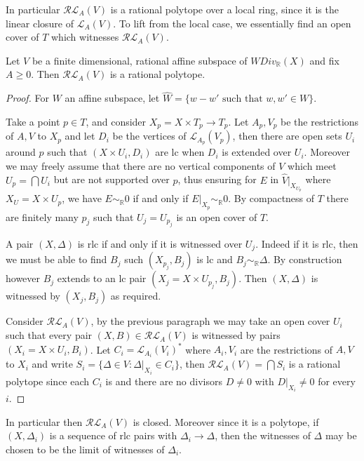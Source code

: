 	
	In particular $\mathcal{RL}_{A}(V)$ is a rational polytope over a local ring, since it is the linear closure of $\mathcal{L}_{A}(V)$. To lift from the local case, we essentially find an open cover of $T$ which witnesses $\mathcal{RL}_{A}(V)$.
	
	\begin{theorem}\label{rlt-poly}
		Let $V$ be a finite dimensional, rational affine subspace of $WDiv_{\mathbb{R}}(X)$ and fix $A \geq 0$. Then $\mathcal{RL}_{A}(V)$ is a rational polytope.
	\end{theorem}
	
	\begin{proof}
		For $W$ an affine subspace, let $\hat{W}=\{w-w' \text{ such that } w,w' \in W\}$.
		
		Take a point $p \in T$, and consider $X_{p}=X\times T_{p} \to T_{p}$. Let $A_{p},V_{p}$ be the restrictions of $A,V$ to $X_{p}$ and let $D_{i}$ be the vertices of $\mathcal{L}_{A_{p}}(V_{p})$, then there are open sets $U_{i}$ around $p$ such that $(X\times U_{i},D_{i})$ are lc when $D_{i}$ is extended over $U_{i}$. Moreover we may freely assume that there are no vertical components of $V$ which meet $U_{p}= \bigcap U_{i}$ but are not supported over $p$, thus ensuring for $E$ in $\hat{V}|_{X_{U_{p}}}$ where $X_{U}=X\times U_{p}$, we have $E \sim_{\mathbb{R}} 0$ if and only if $E|_{X_{p}}\sim_{\mathbb{R}} 0$. By compactness of $T$ there are finitely many $p_{j}$ such that $U_{j}=U_{p_{j}}$ is an open cover of $T$. 
		
		A pair $(X,\Delta)$ is rlc if and only if it is witnessed over $U_{j}$. Indeed if it is rlc, then we must be able to find $B_{j}$ such $(X_{p_{j}},B_{j})$ is lc and $B_{j} \sim_{\mathbb{R}} \Delta$. By construction however $B_{j}$ extends to an lc pair $(X_{j}=X\times U_{p_{j}},B_{j})$. Then $(X,\Delta)$ is witnessed by $(X_{j}, B_{j})$ as required.
		
		Consider $\mathcal{RL}_{A}(V)$, by the previous paragraph we may take an open cover $U_{i}$ such that every pair $(X,B) \in \mathcal{RL}_{A}(V)$ is witnessed by pairs $(X_{i}=X\times U_{i},B_{i})$. Let $C_{i} = \mathcal{L}_{A_{i}}(V_{i})^{*}$ where $A_{i}, V_{i}$ are the restrictions of $A,V$ to $X_{i}$ and write $S_{i}=\{\Delta \in V: \Delta|_{X_{i}} \in C_{i}\}$, then $\mathcal{RL}_{A}(V)= \bigcap S_{i}$ is a rational polytope since each $C_{i}$ is and there are no divisors $D \neq 0$ with $D|_{X_{i}} \neq 0$ for every $i$.
	\end{proof}
	
	In particular then $\mathcal{RL}_{A}(V)$ is closed. Moreover since it is a polytope, if $(X,\Delta_{i})$ is a sequence of rlc pairs with $\Delta_{i} \to \Delta$, then the witnesses of $\Delta$ may be chosen to be the limit of witnesses of $\Delta_{i}$. 
	
